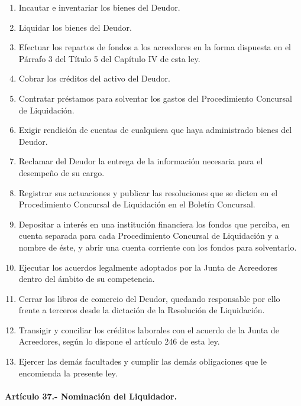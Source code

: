 \documentclass[
]{book}
\begin{document}
\begin{enumerate}
\def\labelenumi{\arabic{enumi})}
\item
  Incautar e inventariar los bienes del Deudor.
\item
  Liquidar los bienes del Deudor.
\item
  Efectuar los repartos de fondos a los acreedores en la forma dispuesta en el Párrafo 3 del Título 5 del Capítulo IV de esta ley.
\item
  Cobrar los créditos del activo del Deudor.
\item
  Contratar préstamos para solventar los gastos del Procedimiento Concursal de Liquidación.
\item
  Exigir rendición de cuentas de cualquiera que haya administrado bienes del Deudor.
\item
  Reclamar del Deudor la entrega de la información necesaria para el desempeño de su cargo.
\item
  Registrar sus actuaciones y publicar las resoluciones que se dicten en el Procedimiento Concursal de Liquidación en el Boletín Concursal.
\item
  Depositar a interés en una institución financiera los fondos que perciba, en cuenta separada para cada Procedimiento Concursal de Liquidación y a nombre de éste, y abrir una cuenta corriente con los fondos para solventarlo.
\item
  Ejecutar los acuerdos legalmente adoptados por la Junta de Acreedores dentro del ámbito de su competencia.
\item
  Cerrar los libros de comercio del Deudor, quedando responsable por ello frente a terceros desde la dictación de la Resolución de Liquidación.
\item
  Transigir y conciliar los créditos laborales con el acuerdo de la Junta de Acreedores, según lo dispone el artículo 246 de esta ley.
\item
  Ejercer las demás facultades y cumplir las demás obligaciones que le encomienda la presente ley.
\end{enumerate}

\hypertarget{artuxedculo-37.--nominaciuxf3n-del-liquidador.}{%
\paragraph*{Artículo 37.- Nominación del Liquidador.}\label{artuxedculo-37.--nominaciuxf3n-del-liquidador.}}
\end{document}
